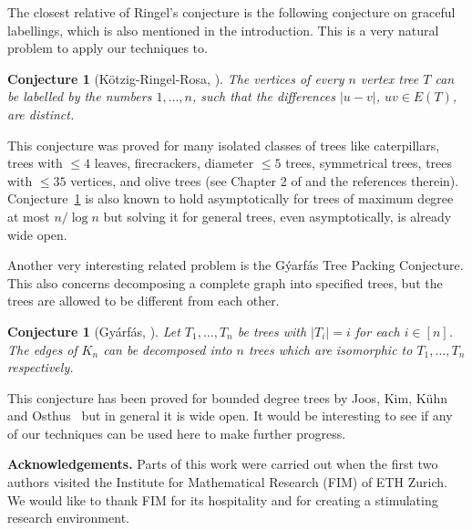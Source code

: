 \documentclass{article}
\newtheorem{conjecture}[lemma]{Conjecture}
\theoremstyle{definition}
\begin{document}
The closest relative of Ringel's conjecture is the following conjecture on graceful labellings, which is also mentioned in the introduction. This is a very natural problem to apply our techniques to.
\begin{conjecture}[K\"otzig-Ringel-Rosa, \cite{rosa1966certain}]\label{Conjecture_Graceful}
The vertices of every $n$ vertex tree $T$ can be labelled by the numbers $1, \dots, n$, such that  the differences $|u-v|$,  $uv\in E(T)$, are distinct.
\end{conjecture}

\noindent
This conjecture was proved for many isolated classes of trees like caterpillars, trees with $\leq 4$ leaves, firecrackers,  diameter $\leq 5$ trees,   symmetrical trees, trees with $\leq 35$ vertices, and olive trees (see Chapter 2 of \cite{gallian2009dynamic} and the references therein).
Conjecture~\ref{Conjecture_Graceful} is also known to hold asymptotically for trees of maximum degree at most $n/\log n$ \cite{adamaszek2016almost} but solving it for general trees, even asymptotically, is already wide open.

Another very interesting related problem is the G\'yarf\'as Tree Packing Conjecture. This also concerns decomposing a complete graph into specified trees, but the trees are allowed to be different from each other.
\begin{conjecture}[Gy\'arf\'as, \cite{gyarfas1978packing}]\label{Conjecture_Gyarfas}
Let $T_1, \dots, T_{n}$ be trees with $|T_i|=i$ for each $i\in [n]$. The edges of $K_n$ can be decomposed into $n$ trees which are isomorphic to  $T_1, \dots, T_{n}$ respectively.
\end{conjecture}
\noindent
This conjecture has been proved for bounded degree trees by Joos, Kim, K{\"u}hn and Osthus~\cite{joos2016optimal} but in general it is wide open.
It would be interesting to see if any of our techniques can be used here to make further progress.

\vspace{0.25cm}
\noindent
{\bf Acknowledgements.} Parts of this work were carried out when the first two authors visited the Institute for Mathematical Research (FIM) of ETH Zurich. We would like to thank FIM for its hospitality and for creating a stimulating research environment.




\end{document}
